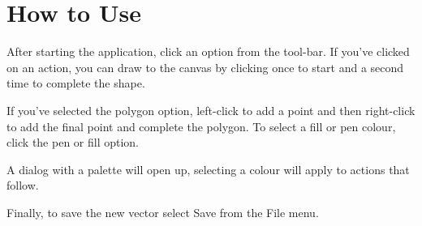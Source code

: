 \section{How to Use}
After starting the application, click an option from the tool-bar.
If you've clicked on an action, you can draw to the canvas by clicking once to start and a second time to complete the shape.
\begin{center}\end{center}
If you've selected the polygon option, left-click to add a point and then right-click to add the final point and complete the polygon.
To select a fill or pen colour, click the pen or fill option.
\begin{center}\end{center}
A dialog with a palette will open up, selecting a colour will apply to actions that follow.
\begin{center}\end{center}
Finally, to save the new vector select Save from the File menu.
